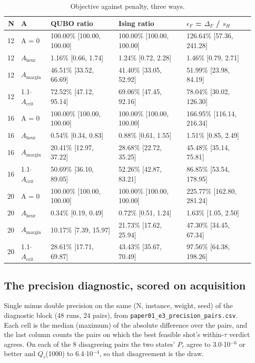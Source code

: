 \documentclass[journal]{IEEEtran}
\begin{document}
\begin{table}[!t]
\centering
\scriptsize
\caption{Objective against penalty, three ways.}
\label{tab:S35}
\begin{tabular}{rllll}
\toprule
N & A & QUBO ratio & Ising ratio & $\epsilon_{F}$ = $\Delta_{F}$ / $s_{H}$ \\
\midrule
12 & A = 0 & 100.00\% [100.00, 100.00] & 100.00\% [100.00, 100.00] & 126.64\% [57.36, 241.28] \\
12 & $A_{\mathrm{heur}}$ & 1.16\% [0.66, 1.74] & 1.24\% [0.72, 2.28] & 1.46\% [0.79, 2.71] \\
12 & $A_{\mathrm{margin}}$ & 46.51\% [33.52, 66.69] & 41.40\% [33.05, 52.92] & 51.99\% [23.98, 84.19] \\
12 & 1.1$\cdot$$A_{\mathrm{crit}}$ & 72.52\% [47.12, 95.14] & 69.06\% [47.45, 92.16] & 78.04\% [30.02, 126.30] \\
16 & A = 0 & 100.00\% [100.00, 100.00] & 100.00\% [100.00, 100.00] & 166.95\% [116.14, 216.34] \\
16 & $A_{\mathrm{heur}}$ & 0.54\% [0.34, 0.83] & 0.88\% [0.61, 1.55] & 1.51\% [0.85, 2.49] \\
16 & $A_{\mathrm{margin}}$ & 20.41\% [12.97, 37.22] & 28.68\% [22.72, 35.25] & 45.48\% [35.14, 75.81] \\
16 & 1.1$\cdot$$A_{\mathrm{crit}}$ & 50.69\% [36.10, 89.05] & 52.26\% [42.87, 83.21] & 86.85\% [53.54, 178.95] \\
20 & A = 0 & 100.00\% [100.00, 100.00] & 100.00\% [100.00, 100.00] & 225.77\% [162.80, 281.24] \\
20 & $A_{\mathrm{heur}}$ & 0.34\% [0.19, 0.49] & 0.72\% [0.51, 1.24] & 1.63\% [1.05, 2.50] \\
20 & $A_{\mathrm{margin}}$ & 10.17\% [7.39, 15.97] & 21.73\% [17.62, 25.94] & 47.30\% [34.45, 67.34] \\
20 & 1.1$\cdot$$A_{\mathrm{crit}}$ & 28.61\% [17.71, 69.87] & 43.43\% [35.67, 70.49] & 97.56\% [64.38, 198.26] \\
\bottomrule
\end{tabular}
\end{table}


\subsection{The precision diagnostic, scored on acquisition}


Single minus double precision on the same (N, instance, weight, seed) of the diagnostic block (48 runs, 24 pairs), from \texttt{paper01\_e3\_precision\_pairs.csv}. Each cell is the median (maximum) of the absolute difference over the pairs, and the last column counts the pairs on which the best feasible shot's within-$\tau$ verdict agrees. On each of the 8 disagreeing pairs the two states' $P_{\tau}$ agree to 3.0$\cdot$10$^{-6}$ or better and $Q_{\tau}$(1000) to 6.4$\cdot$10$^{-4}$, so that disagreement is the draw.
\end{document}
